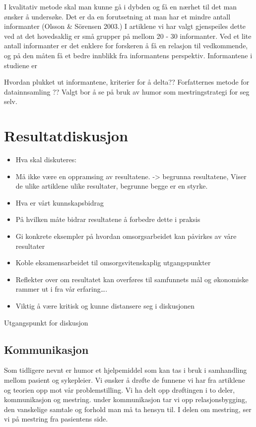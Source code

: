 I kvalitativ metode skal man kunne gå i dybden og få en nærhet til det man
ønsker å undersøke. Det er da en forutsetning at man har et mindre antall
informanter (Olsson \&{} Sörensen 2003.) I artiklene vi har valgt gjenspeiles
dette ved at  det  hovedsaklig er små grupper på mellom 20 - 30 informanter.
Ved et lite antall informanter er det enklere for forskeren å få en relasjon
til vedkommende, og på den måten få et bedre innblikk fra informantens
perspektiv. Informantene i studiene er 

Hvordan plukket ut informantene, kriterier for å delta??  Forfatternes metode
for datainnsamling ??  Valgt bor å se på bruk av humor som mestringstrategi for
seg selv.

\section{Resultatdiskusjon}

\begin{itemize}
\item Hva skal diskuteres: 
\item Må ikke være en oppramsing av resultatene. -> begrunna resultatene, Viser de ulike artiklene ulike resultater, begrunne begge er en styrke. 
\item Hva er vårt kunnskapsbidrag
\item På hvilken måte bidrar resultatene å forbedre dette i praksis
\item Gi konkrete eksempler på hvordan omsorgsarbeidet kan påvirkes av våre resultater
\item Koble eksamensarbeidet til omsorgsvitenskaplig utgangspunkter
\item Reflekter over om resultatet kan overføres til samfunnets mål og økonomiske rammer ut i fra vår erfaring….
\item Viktig å være kritisk og kunne distansere seg i diskusjonen
\end{itemize}

Utgangspunkt for diskusjon

\subsection{Kommunikasjon}

Som tidligere nevnt er humor et hjelpemiddel som kan tas i bruk i samhandling
mellom pasient og sykepleier. Vi ønsker å drøfte de funnene vi har fra
artiklene og teorien opp mot vår problemstilling. Vi ha delt opp drøftingen i
to deler, kommunikasjon og mestring. under kommunikasjon tar vi opp
relasjonsbygging, den vanskelige samtale og forhold man må ta hensyn til. I
delen om mestring, ser vi på mestring fra pasientens side. 

